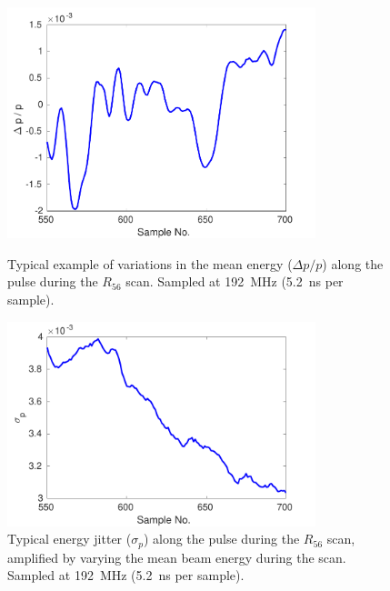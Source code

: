 \begin{figure}
  \centering
  \includegraphics[width=0.8\textwidth]{Figures/propagation/R56ScanGunWiggle_MeanEnergyAlong}
  \caption{Typical example of variations in the mean energy (\(\Delta p/p\)) along the pulse during the \(R_{56}\) scan. Sampled at 192~MHz (5.2~ns per sample).}
  \label{f:R56ScanGunWiggle_MeanEnergyAlong}
  \includegraphics[width=0.8\textwidth]{Figures/propagation/R56ScanGunWiggle_EnergyJitterAlong}
  \caption{Typical energy jitter (\(\sigma_p\)) along the pulse during the \(R_{56}\) scan, amplified by varying the mean beam energy during the scan. Sampled at 192~MHz (5.2~ns per sample).}
  \label{f:R56ScanGunWiggle_EnergyJitterAlong}
\end{figure}

